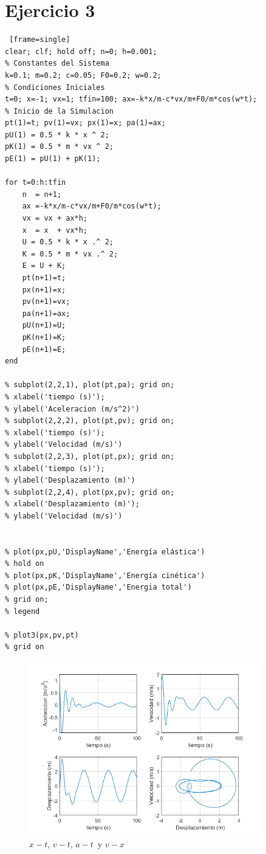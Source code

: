 \documentclass{article}
\begin{document}
\section{Ejercicio 3}

\begin{lstlisting} [frame=single]
clear; clf; hold off; n=0; h=0.001;
% Constantes del Sistema
k=0.1; m=0.2; c=0.05; F0=0.2; w=0.2;
% Condiciones Iniciales
t=0; x=-1; vx=1; tfin=100; ax=-k*x/m-c*vx/m+F0/m*cos(w*t);
% Inicio de la Simulacion
pt(1)=t; pv(1)=vx; px(1)=x; pa(1)=ax;
pU(1) = 0.5 * k * x ^ 2;
pK(1) = 0.5 * m * vx ^ 2;
pE(1) = pU(1) + pK(1);

for t=0:h:tfin
    n  = n+1;
    ax =-k*x/m-c*vx/m+F0/m*cos(w*t);
    vx = vx + ax*h;
    x  = x  + vx*h;
    U = 0.5 * k * x .^ 2;
    K = 0.5 * m * vx .^ 2;
    E = U + K;
    pt(n+1)=t;
    px(n+1)=x;
    pv(n+1)=vx;
    pa(n+1)=ax;
    pU(n+1)=U;
    pK(n+1)=K;
    pE(n+1)=E;
end

% subplot(2,2,1), plot(pt,pa); grid on;
% xlabel('tiempo (s)');
% ylabel('Aceleracion (m/s^2)')
% subplot(2,2,2), plot(pt,pv); grid on;
% xlabel('tiempo (s)');
% ylabel('Velocidad (m/s)')
% subplot(2,2,3), plot(pt,px); grid on;
% xlabel('tiempo (s)');
% ylabel('Desplazamiento (m)')
% subplot(2,2,4), plot(px,pv); grid on;
% xlabel('Desplazamiento (m)');
% ylabel('Velocidad (m/s)')


% plot(px,pU,'DisplayName','Energía elástica')
% hold on
% plot(px,pK,'DisplayName','Energía cinética')
% plot(px,pE,'DisplayName','Energia total')
% grid on;
% legend

% plot3(px,pv,pt)
% grid on
\end{lstlisting}


\begin{figure}[H]
\centering
    \includegraphics[width=0.9\textwidth]{images/003A.png}
    \caption{$x-t$, $v-t$, $a-t $~y $v-x$}
\end{figure}
\end{document}
